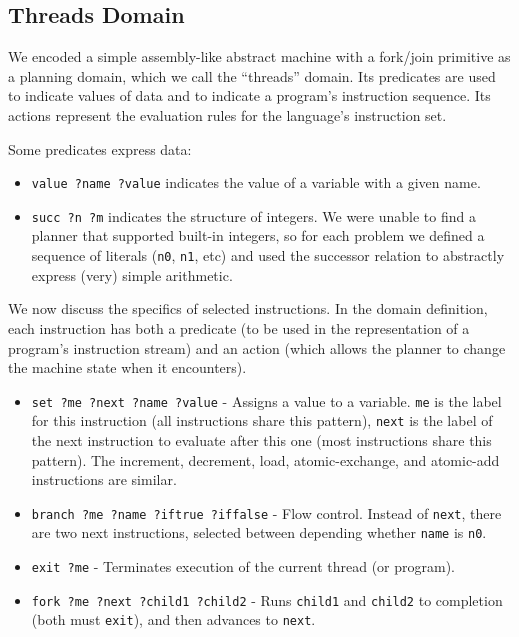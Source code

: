 \subsection{Threads Domain}

We encoded a simple assembly-like abstract machine with a fork/join primitive as a planning domain, which we call the ``threads'' domain.
Its predicates are used to indicate values of data and to indicate a program's instruction sequence.
Its actions represent the evaluation rules for the language's instruction set.

Some predicates express data:
\begin{itemize}
	\item \texttt{value ?name ?value} indicates the value of a variable with a given name.
	\item \texttt{succ ?n ?m} indicates the structure of integers. We were unable to find a planner that supported built-in integers, so for each problem we defined a sequence of literals (\texttt{n0}, \texttt{n1}, etc) and used the successor relation to abstractly express (very) simple arithmetic.
\end{itemize}

We now discuss the specifics of selected instructions. In the domain definition, each instruction has both a predicate (to be used in the representation of a program's instruction stream) and an action (which allows the planner to change the machine state when it encounters).

\begin{itemize}
	\item \texttt{set ?me ?next ?name ?value} - Assigns a value to a variable. \texttt{me} is the label for this instruction (all instructions share this pattern), \texttt{next} is the label of the next instruction to evaluate after this one (most instructions share this pattern). The increment, decrement, load, atomic-exchange, and atomic-add instructions are similar.
	\item \texttt{branch ?me ?name ?iftrue ?iffalse} - Flow control. Instead of \texttt{next}, there are two next instructions, selected between depending whether \texttt{name} is \texttt{n0}.
	\item \texttt{exit ?me} - Terminates execution of the current thread (or program).
	\item \texttt{fork ?me ?next ?child1 ?child2} - Runs \texttt{child1} and \texttt{child2} to completion (both must \texttt{exit}), and then advances to \texttt{next}.
\end{itemize}

